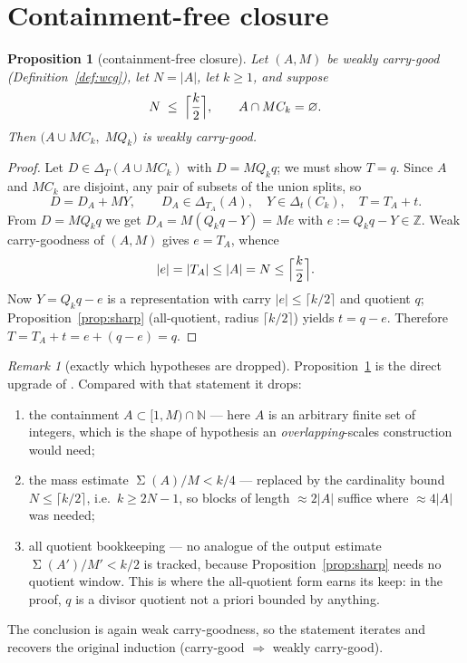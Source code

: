 \documentclass[11pt]{article}
\newtheorem{proposition}{Proposition}
\theoremstyle{definition}
\theoremstyle{remark}
\newtheorem{remark}[lemma]{Remark}
\newcommand{\N}{\mathbb{N}}
\newcommand{\Z}{\mathbb{Z}}
\DeclareMathOperator{\SSum}{\Sigma}
\begin{document}
\section{Containment-free closure}\label{sec:closure}

\begin{proposition}[containment-free closure]\label{prop:closure}
Let $(A,M)$ be weakly carry-good (Definition~\ref{def:wcg}), let $N=|A|$,
let $k\ge1$, and suppose
\[
N\;\le\;\Bigl\lceil\frac{k}{2}\Bigr\rceil,
\qquad
A\cap MC_k=\varnothing .
\]
Then $\bigl(A\cup MC_k,\;MQ_k\bigr)$ is weakly carry-good.
\end{proposition}

\begin{proof}
Let $D\in\Delta_T(A\cup MC_k)$ with $D=MQ_kq$; we must show $T=q$. Since
$A$ and $MC_k$ are disjoint, any pair of subsets of the union splits, so
\[
D=D_A+MY,\qquad D_A\in\Delta_{T_A}(A),\quad Y\in\Delta_t(C_k),\quad
T=T_A+t .
\]
From $D=MQ_kq$ we get $D_A=M(Q_kq-Y)=Me$ with $e:=Q_kq-Y\in\Z$. Weak
carry-goodness of $(A,M)$ gives $e=T_A$, whence
\[
|e|=|T_A|\le|A|=N\le\Bigl\lceil\frac{k}{2}\Bigr\rceil .
\]
Now $Y=Q_kq-e$ is a representation with carry $|e|\le\lceil k/2\rceil$
and quotient $q$; Proposition~\ref{prop:sharp} (all-quotient, radius
$\lceil k/2\rceil$) yields $t=q-e$. Therefore
$T=T_A+t=e+(q-e)=q$.
\end{proof}

\begin{remark}[exactly which hypotheses are dropped]\label{rem:dropped}
Proposition~\ref{prop:closure} is the direct upgrade of
\cite[Lemma~3]{Mazur26}. Compared with that statement it drops:
\begin{enumerate}
\item the containment $A\subset[1,M)\cap\N$ --- here $A$ is an arbitrary
finite set of integers, which is the shape of hypothesis an
\emph{overlapping}-scales construction would need;
\item the mass estimate $\SSum(A)/M<k/4$ --- replaced by the cardinality
bound $N\le\lceil k/2\rceil$, i.e.\ $k\ge2N-1$, so blocks of length
$\approx2|A|$ suffice where $\approx4|A|$ was needed;
\item all quotient bookkeeping --- no analogue of the output estimate
$\SSum(A')/M'<k/2$ is tracked, because Proposition~\ref{prop:sharp} needs
no quotient window. This is where the all-quotient form earns its keep:
in the proof, $q$ is a divisor quotient not a priori bounded by anything.
\end{enumerate}
The conclusion is again weak carry-goodness, so the statement iterates
and recovers the original induction (carry-good $\Rightarrow$ weakly
carry-good).
\end{remark}
\end{document}
